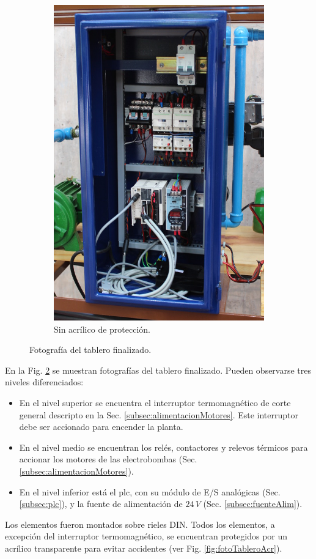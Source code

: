 \begin{figure}[t]
\begin{subfigure}[b]{0.48\textwidth}
\includegraphics[width=\textwidth]{Cap3-TableroElectrico/Images/IMG_5097.JPG}
 \caption{Sin acrílico de protección.}
 \label{fig:fotoTableroSAcr}
        \end{subfigure}
        \caption{Fotografía del tablero finalizado.}
        \label{fig:fotoTablero}
\end{figure}

En la Fig. \ref{fig:fotoTablero} se muestran fotografías del tablero finalizado.
Pueden observarse tres niveles diferenciados:
\begin{itemize}
 \item En el nivel superior se encuentra el interruptor termomagnético de corte
general descripto en la Sec. \ref{subsec:alimentacionMotores}.
Este interruptor debe ser accionado para encender la planta.
\item En el nivel medio se encuentran los relés, contactores y relevos térmicos
para accionar los motores de las electrobombas (Sec.
\ref{subsec:alimentacionMotores}).
\item En el nivel inferior está el
\gls{plc}, con su módulo de E/S analógicas (Sec. \ref{subsec:plc}), y la fuente
de alimentación de $24\,V$ (Sec.
\ref{subsec:fuenteAlim}).
\end{itemize}
Los elementos fueron montados sobre
rieles DIN.  Todos los elementos, a excepción del interruptor
termomagnético, se encuentran protegidos por un acrílico transparente para
evitar accidentes (ver Fig. \ref{fig:fotoTableroAcr}).
